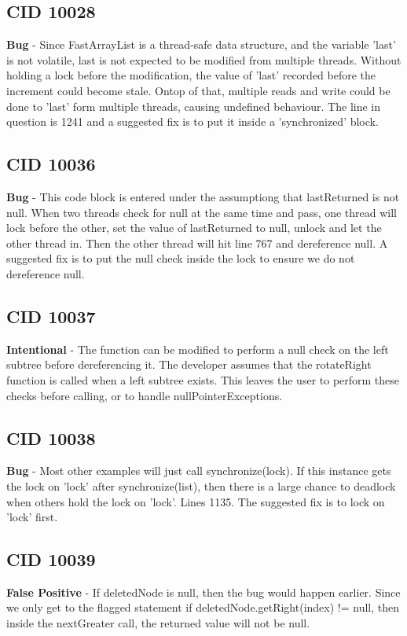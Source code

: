 \documentclass[12pt]{article}
\begin{document}
\subsection{CID 10028}
\textbf{Bug} - Since FastArrayList is a thread-safe data structure, and the variable 'last' is not volatile, last is not expected to be modified from multiple threads. Without holding a lock before the modification, the value of 'last' recorded before the increment could become stale. Ontop of that, multiple reads and write could be done to 'last' form multiple threads, causing undefined behaviour. The line in question is 1241 and a suggested fix is to put it inside a 'synchronized' block.
\subsection{CID 10036}
\textbf{Bug} - This code block is entered under the assumptiong that lastReturned is not null. When two threads check for null at the same time and pass, one thread will lock before the other, set the value of lastReturned to null, unlock and let the other thread in. Then the other thread will hit line 767 and dereference null. A suggested fix is to put the null check inside the lock to ensure we do not dereference null.
\subsection{CID 10037}
\textbf{Intentional} - The function can be modified to perform a null check on the left subtree before dereferencing it. The developer assumes that the rotateRight function is called when a left subtree exists. This leaves the user to perform these checks before calling, or to handle nullPointerExceptions.
\subsection{CID 10038}
\textbf{Bug} - Most other examples will just call synchronize(lock). If this instance gets the lock on 'lock' after synchronize(list), then there is a large chance to deadlock when others hold the lock on 'lock'. Lines 1135. The suggested fix is to lock on 'lock' first.
\subsection{CID 10039}
\textbf{False Positive} - If deletedNode is null, then the bug would happen earlier. Since we only get to the flagged statement if deletedNode.getRight(index) != null, then inside the nextGreater call, the returned value will not be null.
\end{document}
